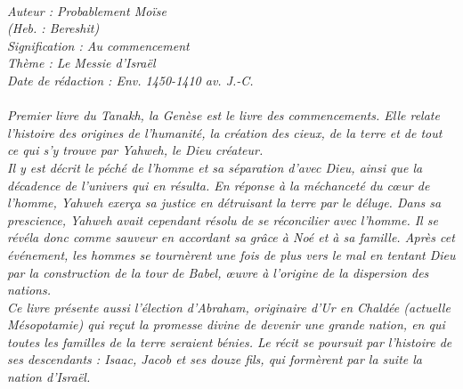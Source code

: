 \BFont
\noindent\hrulefill
{\footnotesize
\textit{
\bigskip
{\centering{}
\\Auteur : Probablement Moïse
\\(Heb. : Bereshit)
\\Signification : Au commencement
\\Thème : Le Messie d'Israël
\\Date de rédaction : Env. 1450-1410 av. J.-C.\\}
}
\textit{
\\Premier livre du Tanakh, la Genèse est le livre des commencements.
Elle relate l'histoire des origines de l'humanité, la création des cieux, de la terre et de tout ce qui s'y trouve par Yahweh, le Dieu créateur.
\\Il y est décrit le péché de l'homme et sa séparation d'avec Dieu, ainsi que la décadence de l'univers qui en résulta. En réponse à la méchanceté du cœur de l'homme, Yahweh exerça sa justice en détruisant la terre par le déluge.
Dans sa prescience, Yahweh avait cependant résolu de se réconcilier avec l'homme. Il se révéla donc comme sauveur en accordant sa grâce à Noé et à sa famille. Après cet événement, les hommes se tournèrent une fois de plus vers le mal en tentant Dieu par la construction de la tour de Babel, œuvre à l'origine de la dispersion des nations.
\\Ce livre présente aussi l'élection d'Abraham, originaire d'Ur en Chaldée (actuelle Mésopotamie) qui reçut la promesse divine de devenir une grande nation, en qui toutes les familles de la terre seraient bénies. Le récit se poursuit par l'histoire de ses descendants : Isaac, Jacob et ses douze fils, qui formèrent par la suite la nation d'Israël.\bigskip
}
}
\par\nobreak\noindent\hrulefill
